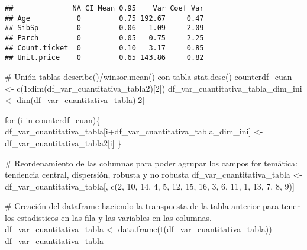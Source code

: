 \documentclass[
]{article}
\newenvironment{Shaded}{\begin{snugshade}}{\end{snugshade}}
\newcommand{\CommentTok}[1]{\textcolor[rgb]{0.50,0.62,0.50}{#1}}
\newcommand{\ControlFlowTok}[1]{\textcolor[rgb]{0.94,0.87,0.69}{#1}}
\newcommand{\DecValTok}[1]{\textcolor[rgb]{0.86,0.86,0.80}{#1}}
\newcommand{\KeywordTok}[1]{\textcolor[rgb]{0.94,0.87,0.69}{#1}}
\newcommand{\NormalTok}[1]{\textcolor[rgb]{0.80,0.80,0.80}{#1}}
\newcommand{\OperatorTok}[1]{\textcolor[rgb]{0.94,0.94,0.82}{#1}}
\newcommand{\StringTok}[1]{\textcolor[rgb]{0.80,0.58,0.58}{#1}}
\begin{document}
\begin{verbatim}
##              NA CI_Mean_0.95    Var Coef_Var
## Age           0         0.75 192.67     0.47
## SibSp         0         0.06   1.09     2.09
## Parch         0         0.05   0.75     2.25
## Count.ticket  0         0.10   3.17     0.85
## Unit.price    0         0.65 143.86     0.82
\end{verbatim}

\begin{Shaded}
\begin{Highlighting}[]
\CommentTok{# Unión tablas describe()/winsor.mean() con tabla stat.desc()}
\NormalTok{counterdf_cuan <-}\StringTok{ }\KeywordTok{c}\NormalTok{(}\DecValTok{1}\OperatorTok{:}\KeywordTok{dim}\NormalTok{(df_var_cuantitativa_tabla2)[}\DecValTok{2}\NormalTok{])}
\NormalTok{df_var_cuantitativa_tabla_dim_ini <-}\StringTok{ }\KeywordTok{dim}\NormalTok{(df_var_cuantitativa_tabla)[}\DecValTok{2}\NormalTok{]}

\ControlFlowTok{for}\NormalTok{ (i }\ControlFlowTok{in}\NormalTok{ counterdf_cuan)\{}
\NormalTok{      df_var_cuantitativa_tabla[i}\OperatorTok{+}\NormalTok{df_var_cuantitativa_tabla_dim_ini] <-}\StringTok{ }\NormalTok{df_var_cuantitativa_tabla2[i]}
\NormalTok{     \}}

\CommentTok{# Reordenamiento de las columnas para poder agrupar los campos for temática: tendencia central, dispersión, robusta y no robusta}
\NormalTok{df_var_cuantitativa_tabla <-}\StringTok{ }\NormalTok{df_var_cuantitativa_tabla[, }\KeywordTok{c}\NormalTok{(}\DecValTok{2}\NormalTok{, }\DecValTok{10}\NormalTok{, }\DecValTok{14}\NormalTok{, }\DecValTok{4}\NormalTok{, }\DecValTok{5}\NormalTok{, }\DecValTok{12}\NormalTok{, }\DecValTok{15}\NormalTok{, }\DecValTok{16}\NormalTok{, }\DecValTok{3}\NormalTok{, }\DecValTok{6}\NormalTok{, }\DecValTok{11}\NormalTok{, }\DecValTok{1}\NormalTok{, }\DecValTok{13}\NormalTok{, }\DecValTok{7}\NormalTok{, }\DecValTok{8}\NormalTok{, }\DecValTok{9}\NormalTok{)]}


\CommentTok{# Creación del dataframe haciendo la transpuesta de la tabla anterior para tener los estadisticos en las fila y las variables en las columnas.}
\NormalTok{df_var_cuantitativa_tabla <-}\StringTok{ }\KeywordTok{data.frame}\NormalTok{(}\KeywordTok{t}\NormalTok{(df_var_cuantitativa_tabla))}
\NormalTok{df_var_cuantitativa_tabla}
\end{Highlighting}
\end{Shaded}
\end{document}
